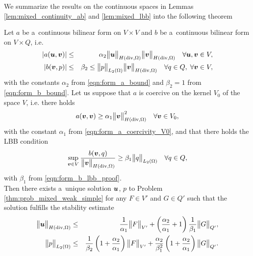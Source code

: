 We summarize the results on the continuous spaces in Lemmas \ref{lem:mixed_continuity_ab} and \ref{lem:mixed_lbb} into the following theorem
\begin{theorem} \label{thm:brezzi_theorem}
Let $a$ be a~continuous bilinear form on $V\times V$ and $b$ be a~continuous bilinear form on $V\times Q$, i.e.
\begin{eqnarray}
    \left|a(\mathbf{\boldsymbol{u}},\mathbf{\boldsymbol{v}})\right| &\leq& \alpha_2 \bigl\Vert\mathbf{\boldsymbol{u}}\bigr\Vert_{H({\rm div},\Omega)} \bigl\Vert\mathbf{\boldsymbol{v}}\bigr\Vert_{H({\rm div},\Omega)} \quad \forall \mathbf{\boldsymbol{u}},\mathbf{\boldsymbol{v}}\in V,\\
    \left|b(\mathbf{\boldsymbol{v}},p)\right| &\leq& \beta_2 \leq \bigl\Vert p\bigr\Vert_{L_2(\Omega)} \bigl\Vert\mathbf{\boldsymbol{v}}\bigr\Vert_{H({\rm div},\Omega)} \quad \forall q\in Q,\;\forall \mathbf{\boldsymbol{v}}\in V,
\end{eqnarray}
with the constants $\alpha_2$ from \eqref{eqn:form_a_bound} and $\beta_2=1$ from \eqref{eqn:form_b_bound}.
Let us suppose that $a$ is coercive on the kernel $V_0$ of the space $V$, i.e. there holds
\begin{equation}
    a(\mathbf{\boldsymbol{v}},\mathbf{\boldsymbol{v}}) \geq \alpha_1 \bigl\Vert\mathbf{\boldsymbol{v}}\bigr\Vert^2_{H({\rm div},\Omega)} \quad \forall \mathbf{\boldsymbol{v}}\in V_0,
\end{equation}
with the constant $\alpha_1$ from \eqref{eqn:form_a_coercivity_V0},
and that there holds the LBB condition
\begin{equation} \label{eqn:brezzi_theorem_lbb}
    \sup_{\mathbf{\boldsymbol{v}}\in V} \frac{b(\mathbf{\boldsymbol{v}},q)}{\bigl\Vert\mathbf{\boldsymbol{v}}\bigr\Vert_{H({\rm div},\Omega)}} \geq \beta_1\bigl\Vert q\bigr\Vert_{L_2(\Omega)} \quad \forall q\in Q,
\end{equation}
with $\beta_1$ from \eqref{eqn:form_b_lbb_proof}.\\
Then there exists a~unique solution $\mathbf{\boldsymbol{u}}$, $p$ to Problem \eqref{thm:prob_mixed_weak_simple} for any $F\in V'$ and $G\in Q'$
such that the solution fulfills the stability estimate
\begin{eqnarray}
    \bigl\Vert\mathbf{\boldsymbol{u}}\bigr\Vert_{H({\rm div},\Omega)} &\leq& \frac{1}{\alpha_1} \bigl\Vert F\bigr\Vert_{V'} + \left( \frac{\alpha_2}{\alpha_1} + 1\right)\frac{1}{\beta_1} \bigl\Vert G\bigr\Vert_{Q'},\\
    \bigl\Vert p\bigr\Vert_{L_2(\Omega)} &\leq& \frac{1}{\beta_2} \left(1+ \frac{\alpha_2}{\alpha_1} \right) \bigl\Vert F\bigr\Vert_{V'}
            + \frac{\alpha_2}{\beta_1^2} \left( 1+ \frac{\alpha_2}{\alpha_1}\right) \bigl\Vert G\bigr\Vert_{Q'}.
\end{eqnarray}
\end{theorem}
